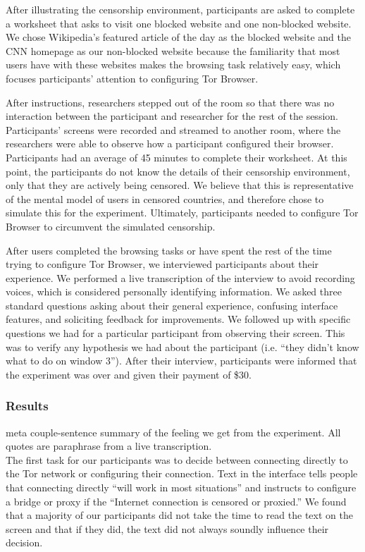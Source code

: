 \documentclass{template}
\begin{document}
After illustrating the censorship environment, participants are asked to 
complete a worksheet that asks to visit one blocked website and one non-blocked website. 
We chose Wikipedia's featured article of the day as the blocked website and 
the CNN homepage as our non-blocked website because the familiarity 
that most users have with these websites makes the browsing task relatively easy, 
which focuses participants' attention to configuring Tor Browser. 

After instructions, researchers stepped out of the room so that there was no interaction
between the participant and researcher for the rest of the session. Participants' screens 
were recorded and streamed to another room, where the researchers were able to 
observe how a participant configured their browser. Participants had an 
average of 45 minutes to complete their worksheet. 
At this point, the participants do not know the details of their censorship environment,
only that they are actively being censored. We believe that this is representative 
of the mental model of users in censored countries, and therefore chose to simulate 
this for the experiment. Ultimately, participants needed to configure Tor Browser to 
circumvent the simulated censorship. 

After users completed the browsing tasks or have spent the rest of the time
trying to configure Tor Browser, we interviewed participants about their experience.
We performed a live transcription of the interview to avoid recording voices, which is
considered personally identifying information. 
We asked three standard questions asking about their general experience, 
confusing interface features, and soliciting feedback for improvements. We followed up
with specific questions we had for a particular participant from observing their screen. 
This was to verify any hypothesis we had about the participant (i.e. ``they didn't know what to do on window 3'').  
After their interview, participants were informed that the experiment was over and 
given their payment of \$30. 

\subsubsection{Results} 
{\color {red} meta couple-sentence summary of the feeling we get from the experiment. All quotes are paraphrase from a live transcription.}\\

The first task for our participants was to decide between connecting directly to the Tor network or configuring their connection. Text in the interface tells people that connecting directly ``will work in most situations'' and instructs to configure a bridge or proxy if the ``Internet connection is censored or proxied.'' We found that a majority of our participants did not take the time to read the text on the screen and that if they did, the text did not always soundly influence their decision.
\end{document}
